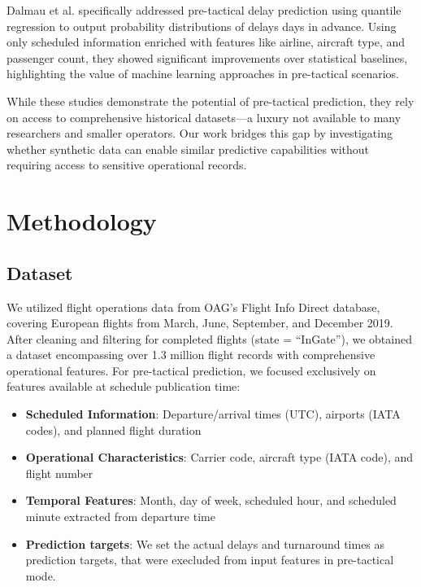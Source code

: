 \documentclass[conference]{IEEEtran}
\begin{document}
Dalmau et al. \cite{dalmau2024probabilistic} specifically addressed pre-tactical delay prediction using quantile regression to output probability distributions of delays days in advance. Using only scheduled information enriched with features like airline, aircraft type, and passenger count, they showed significant improvements over statistical baselines, highlighting the value of machine learning approaches in pre-tactical scenarios.

While these studies demonstrate the potential of pre-tactical prediction, they rely on access to comprehensive historical datasets—a luxury not available to many researchers and smaller operators. Our work bridges this gap by investigating whether synthetic data can enable similar predictive capabilities without requiring access to sensitive operational records.


\section{Methodology}

\subsection{Dataset}
We utilized flight operations data from OAG's Flight Info Direct database, covering European flights from March, June, September, and December 2019. After cleaning and filtering for completed flights (state = ``InGate''), we obtained a dataset encompassing over 1.3 million flight records with comprehensive operational features. For pre-tactical prediction, we focused exclusively on features available at schedule publication time:

\begin{itemize}
    \item \textbf{Scheduled Information}: Departure/arrival times (UTC), airports (IATA codes), and planned flight duration
    \item \textbf{Operational Characteristics}: Carrier code, aircraft type (IATA code), and flight number
    \item \textbf{Temporal Features}: Month, day of week, scheduled hour, and scheduled minute extracted from departure time
    \item \textbf{Prediction targets}: We set the actual delays and turnaround times as prediction targets, that were execluded from input features in pre-tactical mode. 
\end{itemize}
\end{document}
